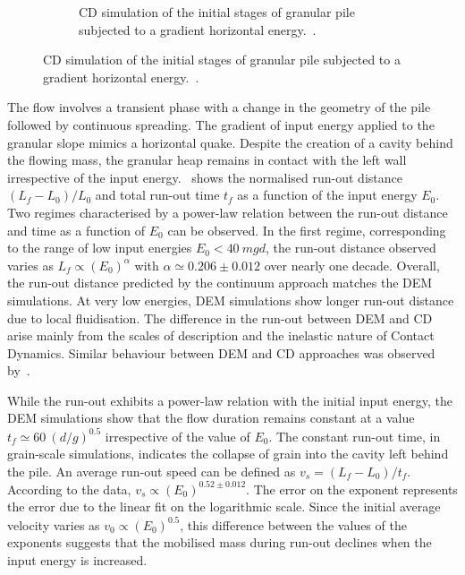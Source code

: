 \documentclass[3p,times,procedia,number]{elsarticle}
\begin{document}
\begin{figure}[tbph]
\begin{subfigure}[b]{0.47\textwidth}
    \caption{CD simulation of the initial stages of granular pile subjected to a 
    gradient horizontal energy.~\citep{Mutabaruka2013}.}
    \label{fig:Gradient_Slope_CD_200J}
  \end{subfigure}
  \label{fig:gradvelocity_200j}
\end{figure}


The flow involves a transient phase with a change in the geometry of the pile 
followed by continuous spreading. The gradient of input energy applied to the 
granular slope mimics a horizontal quake. Despite the creation 
of a cavity behind the flowing mass, the granular heap remains in 
contact with the left wall irrespective of the input 
energy.~ shows the normalised run-out distance 
$(L_f - L_0)/L_0$ and total run-out time $t_f$ as a function of the input 
energy $E_0$. Two regimes characterised by a power-law relation between 
the run-out distance and time as a function of $E_0$ can be observed. In the 
first regime, corresponding to the range of low input energies $E_0 < 40 \ 
mgd$, the run-out distance observed varies as $L_f \propto (E_0)^\alpha$ with 
$\alpha 
\simeq 0.206 \pm 0.012$ over nearly one decade. Overall, the run-out distance 
predicted by the continuum approach matches the DEM simulations. At very low 
energies, DEM simulations show longer run-out distance due to local 
fluidisation. The difference in the run-out between DEM and CD arise mainly 
from the scales of description and the inelastic nature of Contact Dynamics. 
Similar behaviour between DEM and CD approaches was observed 
by~\citet{Radjai1997}. 


While the run-out exhibits a power-law relation with the initial input energy, 
the DEM simulations show that the flow duration remains constant at a value  
$t_f \simeq 60 \  (d/g)^{0.5}$ irrespective of the value of $E_0$. The constant 
run-out time, in grain-scale simulations, indicates the collapse of grain into 
the cavity left behind the pile. An average run-out speed can be defined as 
$v_s = (L_f - L_0) / t_f$. According to the data, $v_s \propto 
(E_0)^{0.52\pm 0.012}$. The error on the exponent represents the 
error due to the linear fit on the logarithmic scale. Since the initial 
average velocity varies as $v_0 \propto (E_0)^{0.5}$, this difference between 
the values of the exponents suggests that the mobilised mass during run-out 
declines when the input energy is increased.
\end{document}

